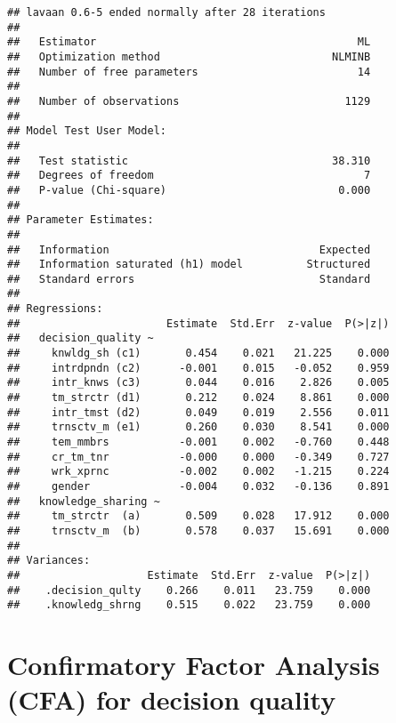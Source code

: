 \documentclass[]{article}
\begin{document}
\begin{verbatim}
## lavaan 0.6-5 ended normally after 28 iterations
## 
##   Estimator                                         ML
##   Optimization method                           NLMINB
##   Number of free parameters                         14
##                                                       
##   Number of observations                          1129
##                                                       
## Model Test User Model:
##                                                       
##   Test statistic                                38.310
##   Degrees of freedom                                 7
##   P-value (Chi-square)                           0.000
## 
## Parameter Estimates:
## 
##   Information                                 Expected
##   Information saturated (h1) model          Structured
##   Standard errors                             Standard
## 
## Regressions:
##                       Estimate  Std.Err  z-value  P(>|z|)
##   decision_quality ~                                     
##     knwldg_sh (c1)       0.454    0.021   21.225    0.000
##     intrdpndn (c2)      -0.001    0.015   -0.052    0.959
##     intr_knws (c3)       0.044    0.016    2.826    0.005
##     tm_strctr (d1)       0.212    0.024    8.861    0.000
##     intr_tmst (d2)       0.049    0.019    2.556    0.011
##     trnsctv_m (e1)       0.260    0.030    8.541    0.000
##     tem_mmbrs           -0.001    0.002   -0.760    0.448
##     cr_tm_tnr           -0.000    0.000   -0.349    0.727
##     wrk_xprnc           -0.002    0.002   -1.215    0.224
##     gender              -0.004    0.032   -0.136    0.891
##   knowledge_sharing ~                                    
##     tm_strctr  (a)       0.509    0.028   17.912    0.000
##     trnsctv_m  (b)       0.578    0.037   15.691    0.000
## 
## Variances:
##                    Estimate  Std.Err  z-value  P(>|z|)
##    .decision_qulty    0.266    0.011   23.759    0.000
##    .knowledg_shrng    0.515    0.022   23.759    0.000
\end{verbatim}

\hypertarget{confirmatory-factor-analysis-cfa-for-decision-quality}{%
\section{Confirmatory Factor Analysis (CFA) for decision
quality}\label{confirmatory-factor-analysis-cfa-for-decision-quality}}
\end{document}
